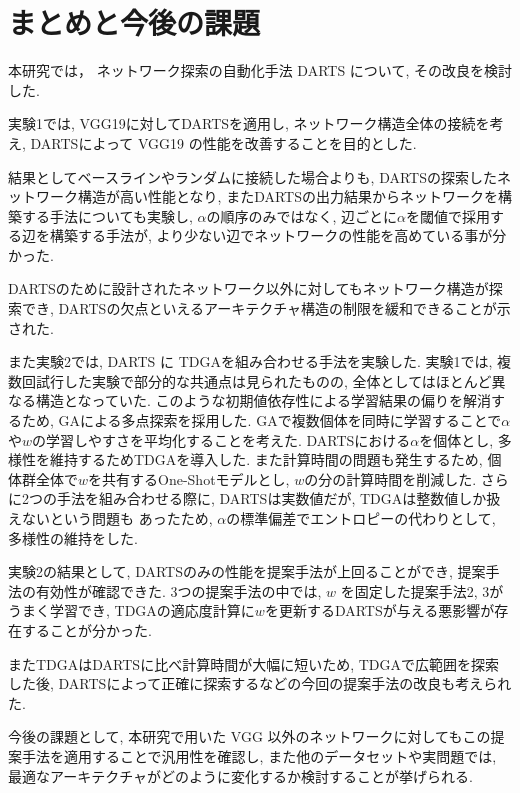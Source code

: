 \newpage
\changeindent{0cm}
\section{まとめと今後の課題}
\label{sec:conclusion}
\changeindent{2cm}

本研究では，
ネットワーク探索の自動化手法 DARTS について, その改良を検討した.

実験1では,
VGG19に対してDARTSを適用し, ネットワーク構造全体の接続を考え,
DARTSによって VGG19 の性能を改善することを目的とした.

結果としてベースラインやランダムに接続した場合よりも,
DARTSの探索したネットワーク構造が高い性能となり,
またDARTSの出力結果からネットワークを構築する手法についても実験し,
$\alpha$の順序のみではなく, 辺ごとに$\alpha$を閾値で採用する辺を構築する手法が,
より少ない辺でネットワークの性能を高めている事が分かった.

DARTSのために設計されたネットワーク以外に対してもネットワーク構造が探索でき,
DARTSの欠点といえるアーキテクチャ構造の制限を緩和できることが示された.

また実験2では,
DARTS に TDGAを組み合わせる手法を実験した.
実験1では, 複数回試行した実験で部分的な共通点は見られたものの,
全体としてはほとんど異なる構造となっていた.
このような初期値依存性による学習結果の偏りを解消するため,
GAによる多点探索を採用した.
GAで複数個体を同時に学習することで$\alpha$や$w$の学習しやすさを平均化することを考えた.
DARTSにおける$\alpha$を個体とし, 多様性を維持するためTDGAを導入した.
また計算時間の問題も発生するため, 個体群全体で$w$を共有するOne-Shotモデルとし,
$w$の分の計算時間を削減した.
さらに2つの手法を組み合わせる際に, DARTSは実数値だが, TDGAは整数値しか扱えないという問題も
あったため, $\alpha$の標準偏差でエントロピーの代わりとして, 多様性の維持をした.

実験2の結果として, DARTSのみの性能を提案手法が上回ることができ, 提案手法の有効性が確認できた.
3つの提案手法の中では, $w$ を固定した提案手法2, 3がうまく学習でき,
TDGAの適応度計算に$w$を更新するDARTSが与える悪影響が存在することが分かった.

またTDGAはDARTSに比べ計算時間が大幅に短いため,
TDGAで広範囲を探索した後, DARTSによって正確に探索するなどの今回の提案手法の改良も考えられた.


今後の課題として,
本研究で用いた VGG 以外のネットワークに対してもこの提案手法を適用することで汎用性を確認し,
また他のデータセットや実問題では, 最適なアーキテクチャがどのように変化するか検討することが挙げられる.
